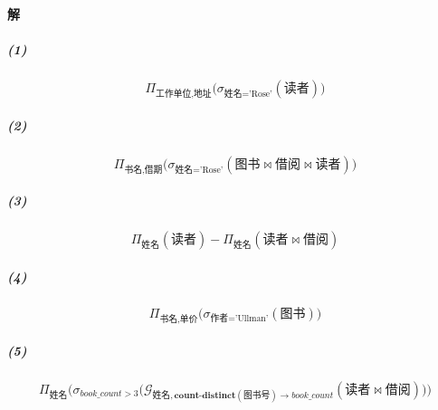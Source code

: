 \documentclass{article}
\begin{document}
\paragraph{解}
\subparagraph{(1)}
{ \kaishu
\begin{Large}
\begin{equation*}
    \Pi_{\text{工作单位}, \text{地址}}\big(\sigma_{\text{姓名} = \text{'Rose'}}(\text{读者})\big)
\end{equation*}
\end{Large}

\subparagraph{(2)}
\begin{Large}
\begin{equation*}
    \Pi_{\text{书名}, \text{借期}}\big(\sigma_{\text{姓名} = \text{'Rose'}}(\text{图书} \Join \text{借阅} \Join \text{读者})\big)
\end{equation*}
\end{Large}

\subparagraph{(3)}
\begin{Large}
\begin{equation*}
    \Pi_{\text{姓名}}(\text{读者}) - \Pi_{\text{姓名}}(\text{读者} \Join \text{借阅})
\end{equation*}
\end{Large}

\subparagraph{(4)}
\begin{Large}
\begin{equation*}
    \Pi_{\text{书名}, \text{单价}}\big(\sigma_{\text{作者} = \text{'Ullman'}}(\text{图书})\big)
\end{equation*}
\end{Large}

\subparagraph{(5)}
\begin{Large}
\begin{equation*}
    \Pi_{\text{姓名}}\Big(\sigma_{\textit{book\_count} > 3}\big(\mathcal{G}_{\text{姓名}, \textbf{count-distinct}(\text{图书号}) \rightarrow \textit{book\_count}}(\text{读者} \Join \text{借阅})\big)\Big)
\end{equation*}
\end{Large}
}
\end{document}
